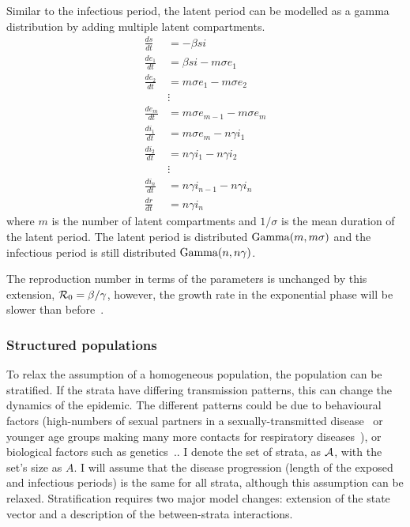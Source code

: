 \documentclass[thesis.tex]{subfiles}
\begin{document}
Similar to the infectious period, the latent period can be modelled as a gamma distribution by adding multiple latent compartments.
\begin{align}
\frac{ds}{dt} &= -\beta si \\
\frac{de_1}{dt} &= \beta si - m\sigma e_1 \\
\frac{de_2}{dt} &= m\sigma e_1 - m \sigma e_2 \\
&\vdots \nonumber \\
\frac{de_m}{dt} &= m\sigma e_{m-1} - m \sigma e_m \\
\frac{di_1}{dt} &= m\sigma e_m - n\gamma i_1 \\
\frac{di_2}{dt} &= n\gamma i_1 - n \gamma i_2 \\
&\vdots \nonumber \\
\frac{di_n}{dt} &= n\gamma i_{n-1} - n \gamma i_n \\
\frac{dr}{dt} &= n\gamma i_n
\end{align}
where $m$ is the number of latent compartments and $1/\sigma$ is the mean duration of the latent period.
The latent period is distributed $\operatorname{Gamma}(m, m\sigma)$ and the infectious period is still distributed $\operatorname{Gamma}(n, n\gamma)$.

The reproduction number in terms of the parameters is unchanged by this extension, \ie $\mathcal{R}_{0} = \beta / \gamma$, however, the growth rate in the exponential phase will be slower than before~\autocite[41]{keelingModeling}.

\subsubsection{Structured populations} \label{SEIR:sec:structured-populations}

To relax the assumption of a homogeneous population, the population can be stratified.
If the strata have differing transmission patterns, this can change the dynamics of the epidemic.
The different patterns could be due to behavioural factors (\eg high-numbers of sexual partners in a sexually-transmitted disease~\autocite[69]{keelingModeling} or younger age groups making many more contacts for respiratory diseases~\autocite[176]{andersonInfectious}), or biological factors such as genetics~\autocite[208]{andersonInfectious}..
I denote the set of strata, as $\mathcal{A}$, with the set's size as $A$.
I will assume that the disease progression (\ie length of the exposed and infectious periods) is the same for all strata, although this assumption can be relaxed.
Stratification requires two major  model changes: extension of the state vector and a description of the between-strata interactions.
\end{document}
